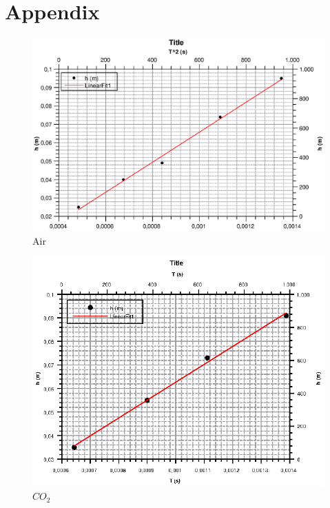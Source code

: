 \documentclass{scrartcl}
\begin{document}
\section{Appendix}

\begin{figure}[h]
    \centering
    \includegraphics[width=12cm]{Graph_air.eps}
    \caption{Air}
    \label{fig:my_label}
\end{figure}

\begin{figure}
    \centering
    \includegraphics[width=12cm]{Graph_CO2.eps}
    \caption{$CO_2$}
    \label{fig:my_label}
\end{figure}
\end{document}
